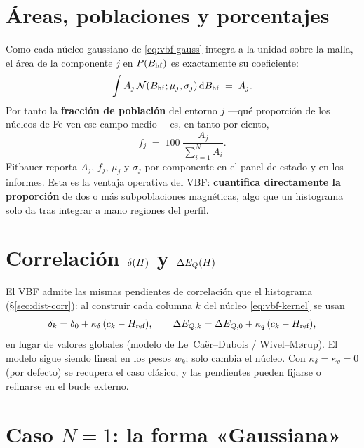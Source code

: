 \section{Áreas, poblaciones y porcentajes}
\label{sec:vbf-areas2}

Como cada núcleo gaussiano de \eqref{eq:vbf-gauss} integra a la unidad sobre la
malla, el área de la componente $j$ en $P(B_{\mathrm{hf}})$ es exactamente su coeficiente:
\begin{equation}
  \int A_j\,\mathcal N(B_{\mathrm{hf}};\mu_j,\sigma_j)\,\mathrm{d}B_{\mathrm{hf}} \;=\; A_j .
\end{equation}
Por tanto la \textbf{fracción de población} del entorno $j$ —qué proporción de los
núcleos de Fe ven ese campo medio— es, en tanto por ciento,
\begin{equation}
  f_j \;=\; 100\;\frac{A_j}{\sum_{i=1}^{N} A_i}.
  \label{eq:vbf-pop}
\end{equation}
Fitbauer reporta $A_j$, $f_j$, $\mu_j$ y $\sigma_j$ por componente en el panel de
estado y en los informes. Esta es la ventaja operativa del VBF: \textbf{cuantifica
directamente la proporción} de dos o más subpoblaciones magnéticas, algo que un
histograma solo da tras integrar a mano regiones del perfil.

\section{Correlación \texorpdfstring{$\delta(H)$}{d(H)} y \texorpdfstring{$\Delta E_{Q}(H)$}{DEQ(H)}}
\label{sec:vbf-corr}

El VBF admite las mismas pendientes de correlación que el histograma
(\S\ref{sec:dist-corr}): al construir cada columna $k$ del núcleo
\eqref{eq:vbf-kernel} se usan
\begin{equation}
  \delta_k = \delta_0 + \kappa_\delta\,(c_k - H_{\text{ref}}),\qquad
  \Delta E_{Q,k} = \Delta E_{Q,0} + \kappa_q\,(c_k - H_{\text{ref}}),
\end{equation}
en lugar de valores globales (modelo de Le~Caër--Dubois / Wivel--M\o{}rup). El
modelo sigue siendo lineal en los pesos $w_k$; solo cambia el núcleo. Con
$\kappa_\delta=\kappa_q=0$ (por defecto) se recupera el caso clásico, y las
pendientes pueden fijarse o refinarse en el bucle externo.

\section{Caso \texorpdfstring{$N=1$}{N=1}: la forma «Gaussiana»}
\label{sec:vbf-gaussiana}

